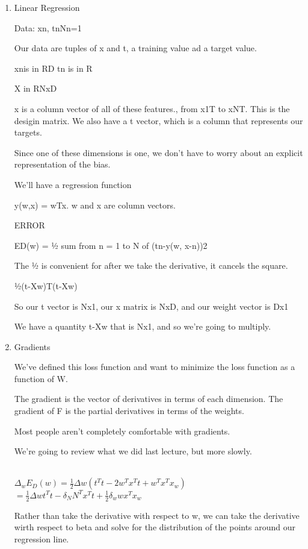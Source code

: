 \documentclass[12pt]{article}
\begin{document}
\begin{enumerate}
\item
Linear Regression

Data: {xn, tn}Nn=1 

Our data are tuples of x and t, a training value ad a target value.

xnis in RD
tn is in R

X in RNxD

x is a column vector of all of these features., from x1T to xNT. This is the desigin matrix. We also have a t vector, which is a column that represents our targets.

Since one of these dimensions is one, we don’t have to worry about an explicit representation of the bias.

We’ll have a regression function

y(w,x) = wTx. w and x are column vectors.

ERROR

ED(w) = ½ sum from n = 1 to N of (tn-y(w, x-n))2

The ½ is convenient for after we take the derivative, it cancels the square.

½(t-Xw)T(t-Xw)

So our t vector is Nx1, our x matrix is NxD, and our weight vector is Dx1

We have a quantity t-Xw that is Nx1, and so we’re going to multiply.
\item
Gradients

We’ve defined this loss function and want to minimize the loss function as a function of W.

The gradient is the vector of derivatives in terms of each dimension. The gradient of F is the partial derivatives in terms of the weights.

Most people aren't completely comfortable with gradients.

We're going to review what we did last lecture, but more slowly. \\\\
\begin{center}
$\Delta_{w}E_{D}(w) = \frac{1}{2} \Delta w(t^{T}t-2w^{T}x^{T}t+w^{T}x^{T}x_{w})$\\
$ = \frac{1}{2} \Delta wt^{T}t-\delta _{N}N^{T}x^{T} t + \frac{1}{2}\delta _{w}wx^{T}x_{w}$
\end{center}

Rather than take the derivative with respect to w, we can take the derivative wirth respect to beta and solve for the distribution of the points around our regression line.


\end{enumerate}
\end{document}
